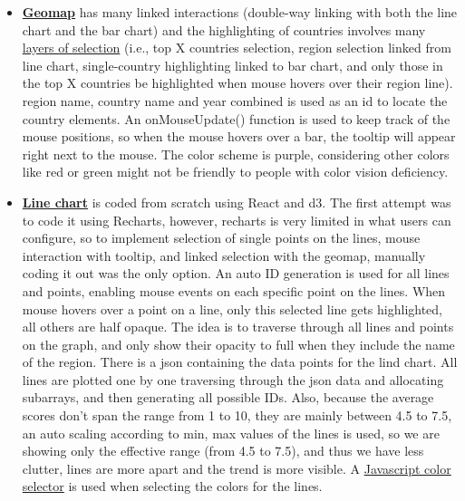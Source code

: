 \documentclass{article}
\begin{document}
\begin{itemize}
    \item  \textbf{\href{https://github.com/SilvesterYu/DATS-SHU235-Information-Visualization-Final-Project/blob/main/src/index.js}{Geomap}} has many linked interactions (double-way linking with both the line chart and the bar chart) and the highlighting of countries involves many \href{https://github.com/SilvesterYu/DATS-SHU235-Information-Visualization-Final-Project/blob/main/src/index.js}{layers of selection} (i.e., top X countries selection, region selection linked from line chart, single-country highlighting linked to bar chart, and only those in the top X countries be highlighted when mouse hovers over their region line). region name, country name and year combined is used as an id to locate the country elements. An onMouseUpdate() function is used to keep track of the mouse positions, so when the mouse hovers over a bar, the tooltip will appear right next to the mouse. The color scheme is purple, considering other colors like red or green might not be friendly to people with color vision deficiency. 
    
    \item \textbf{\href{https://github.com/SilvesterYu/DATS-SHU235-Information-Visualization-Final-Project/blob/main/src/lineChart.js}{Line chart}} is coded from scratch using React and d3. The first attempt was to code it using Recharts, however, recharts is very limited in what users can configure, so to implement selection of single points on the lines, mouse interaction with tooltip, and linked selection with the geomap, manually coding it out was the only option. An auto ID generation is used for all lines and points, enabling mouse events on each specific point on the lines. When mouse hovers over a point on a line, only this selected line gets highlighted, all others are half opaque. The idea is to traverse through all lines and points on the graph, and only show their opacity to full when they include the name of the region. There is a json containing the data points for the lind chart. All lines are plotted one by one traversing through the json data and allocating subarrays, and then generating all possible IDs. Also, because the average scores don't span the range from 1 to 10, they are mainly between 4.5 to 7.5, an auto scaling according to min, max values of the lines is used, so we are showing only the effective range (from 4.5 to 7.5), and thus we have less clutter, lines are more apart and the trend is more visible. A \href{https://jscolor.com/}{Javascript color selector} is used when selecting the colors for the lines.
    

\end{itemize}
\end{document}
